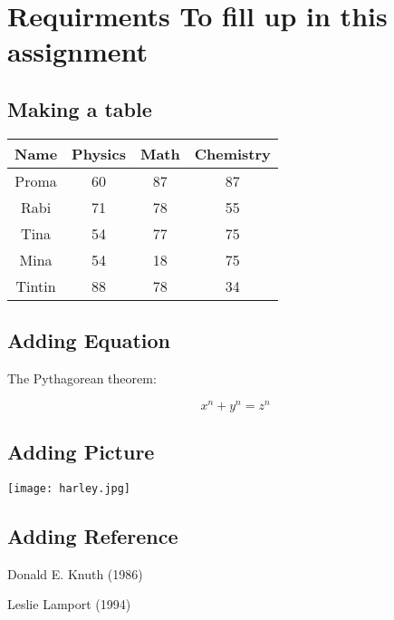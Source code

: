 \documentclass{article}
\begin{document}
\section{Requirments To fill up in this assignment}
\subsection{Making a table}
\begin{center}
\begin{tabular}{||c c c c||} 
 \hline
 Name & Physics & Math & Chemistry \\ [0.5ex] 
 \hline\hline
 Proma & 60 & 87 & 87 \\ 
 \hline
 Rabi & 71 & 78 & 55 \\
 \hline
 Tina & 54 & 77 & 75 \\
 \hline
 Mina & 54 & 18 & 75 \\
 \hline
 Tintin & 88 & 78 & 34 \\ [1ex] 
 \hline
\end{tabular}
\end{center}



\subsection{Adding Equation}

The Pythagorean theorem:

\[ x^n + y^n = z^n \]

\subsection{Adding Picture}
\texttt{[image: harley.jpg]}
\subsection{Adding Reference}

\begin{thebibliography}{9}
Donald E. Knuth (1986)

Leslie Lamport (1994)
\end{thebibliography}
                          
\end{document}

